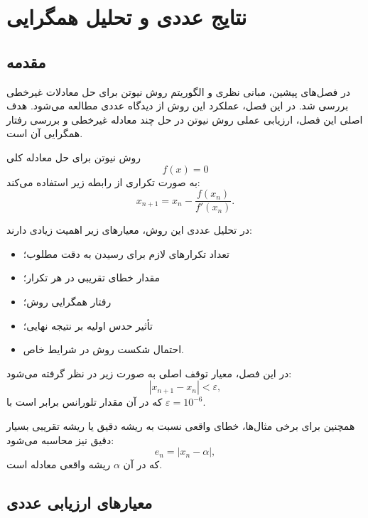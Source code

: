 \chapter{نتایج عددی و تحلیل همگرایی}\label{ch:results}

\section{مقدمه}

در فصل‌های پیشین، مبانی نظری و الگوریتم روش نیوتن برای حل معادلات غیرخطی بررسی شد. 
در این فصل، عملکرد این روش از دیدگاه عددی مطالعه می‌شود. هدف اصلی این فصل، ارزیابی عملی روش نیوتن در حل چند معادله غیرخطی و بررسی رفتار همگرایی آن است.

روش نیوتن برای حل معادله کلی
\begin{equation}
f(x)=0
\label{eq:ch4-fzero}
\end{equation}
به صورت تکراری از رابطه زیر استفاده می‌کند:
\begin{equation}
x_{n+1}=x_n-\frac{f(x_n)}{f'(x_n)}.
\label{eq:ch4-newton}
\end{equation}

در تحلیل عددی این روش، معیارهای زیر اهمیت زیادی دارند:
\begin{itemize}
\item تعداد تکرارهای لازم برای رسیدن به دقت مطلوب؛
\item مقدار خطای تقریبی در هر تکرار؛
\item رفتار همگرایی روش؛
\item تأثیر حدس اولیه بر نتیجه نهایی؛
\item احتمال شکست روش در شرایط خاص.
\end{itemize}

در این فصل، معیار توقف اصلی به صورت زیر در نظر گرفته می‌شود:
\begin{equation}
|x_{n+1}-x_n|<\varepsilon,
\label{eq:ch4-stop-diff}
\end{equation}
که در آن مقدار تلورانس برابر است با $\varepsilon = 10^{-6}$.

همچنین برای برخی مثال‌ها، خطای واقعی نسبت به ریشه دقیق یا ریشه تقریبی بسیار دقیق نیز محاسبه می‌شود:
\begin{equation}
e_n = |x_n-\alpha|,
\label{eq:ch4-error}
\end{equation}
که در آن $\alpha$ ریشه واقعی معادله است.

\section{معیارهای ارزیابی عددی}

